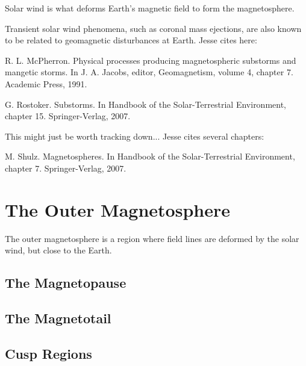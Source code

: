 Solar wind is what deforms Earth's magnetic field to form the magnetosphere. 

Transient solar wind phenomena, such as coronal mass ejections, are also known to be related to geomagnetic disturbances at Earth. Jesse cites here: 

R. L. McPherron. Physical processes producing magnetospheric substorms and mangetic storms. In J. A. Jacobs, editor, Geomagnetism, volume 4, chapter 7. Academic Press, 1991.

G. Rostoker. Substorms. In Handbook of the Solar-Terrestrial Environment, chapter 15. Springer-Verlag, 2007.

This might just be worth tracking down... Jesse cites several chapters: 

M. Shulz. Magnetospheres. In Handbook of the Solar-Terrestrial Environment, chapter 7. Springer-Verlag, 2007.





\section{The Outer Magnetosphere}

The outer magnetosphere is a region where field lines are deformed by the solar wind, but close to the Earth. 

\subsection{The Magnetopause}

\subsection{The Magnetotail}

\subsection{Cusp Regions}


